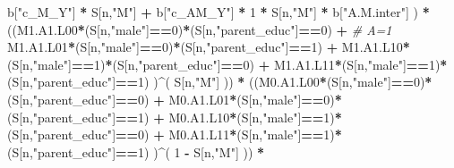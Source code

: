 \documentclass[
]{book}
\newenvironment{Shaded}{\begin{snugshade}}{\end{snugshade}}
\newcommand{\CommentTok}[1]{\textcolor[rgb]{0.56,0.35,0.01}{\textit{#1}}}
\newcommand{\DecValTok}[1]{\textcolor[rgb]{0.00,0.00,0.81}{#1}}
\newcommand{\NormalTok}[1]{#1}
\newcommand{\SpecialCharTok}[1]{\textcolor[rgb]{0.81,0.36,0.00}{\textbf{#1}}}
\newcommand{\StringTok}[1]{\textcolor[rgb]{0.31,0.60,0.02}{#1}}
\begin{document}
\begin{Shaded}
\begin{Highlighting}[]
\NormalTok{                             b[}\StringTok{"c\_M\_Y"}\NormalTok{] }\SpecialCharTok{*}\NormalTok{ S[n,}\StringTok{"M"}\NormalTok{] }\SpecialCharTok{+}
\NormalTok{                             b[}\StringTok{"c\_AM\_Y"}\NormalTok{] }\SpecialCharTok{*} \DecValTok{1} \SpecialCharTok{*}\NormalTok{ S[n,}\StringTok{"M"}\NormalTok{] }\SpecialCharTok{*}\NormalTok{ b[}\StringTok{"A.M.inter"}\NormalTok{] ) }\SpecialCharTok{*}
\NormalTok{      ((M1.A1.L00}\SpecialCharTok{*}\NormalTok{(S[n,}\StringTok{"male"}\NormalTok{]}\SpecialCharTok{==}\DecValTok{0}\NormalTok{)}\SpecialCharTok{*}\NormalTok{(S[n,}\StringTok{"parent\_educ"}\NormalTok{]}\SpecialCharTok{==}\DecValTok{0}\NormalTok{) }\SpecialCharTok{+}                    \CommentTok{\# A\textquotesingle{}=1}
\NormalTok{          M1.A1.L01}\SpecialCharTok{*}\NormalTok{(S[n,}\StringTok{"male"}\NormalTok{]}\SpecialCharTok{==}\DecValTok{0}\NormalTok{)}\SpecialCharTok{*}\NormalTok{(S[n,}\StringTok{"parent\_educ"}\NormalTok{]}\SpecialCharTok{==}\DecValTok{1}\NormalTok{) }\SpecialCharTok{+}
\NormalTok{          M1.A1.L10}\SpecialCharTok{*}\NormalTok{(S[n,}\StringTok{"male"}\NormalTok{]}\SpecialCharTok{==}\DecValTok{1}\NormalTok{)}\SpecialCharTok{*}\NormalTok{(S[n,}\StringTok{"parent\_educ"}\NormalTok{]}\SpecialCharTok{==}\DecValTok{0}\NormalTok{) }\SpecialCharTok{+} 
\NormalTok{          M1.A1.L11}\SpecialCharTok{*}\NormalTok{(S[n,}\StringTok{"male"}\NormalTok{]}\SpecialCharTok{==}\DecValTok{1}\NormalTok{)}\SpecialCharTok{*}\NormalTok{(S[n,}\StringTok{"parent\_educ"}\NormalTok{]}\SpecialCharTok{==}\DecValTok{1}\NormalTok{) )}\SpecialCharTok{\^{}}\NormalTok{( S[n,}\StringTok{"M"}\NormalTok{] )) }\SpecialCharTok{*}
\NormalTok{      ((M0.A1.L00}\SpecialCharTok{*}\NormalTok{(S[n,}\StringTok{"male"}\NormalTok{]}\SpecialCharTok{==}\DecValTok{0}\NormalTok{)}\SpecialCharTok{*}\NormalTok{(S[n,}\StringTok{"parent\_educ"}\NormalTok{]}\SpecialCharTok{==}\DecValTok{0}\NormalTok{) }\SpecialCharTok{+}                
\NormalTok{          M0.A1.L01}\SpecialCharTok{*}\NormalTok{(S[n,}\StringTok{"male"}\NormalTok{]}\SpecialCharTok{==}\DecValTok{0}\NormalTok{)}\SpecialCharTok{*}\NormalTok{(S[n,}\StringTok{"parent\_educ"}\NormalTok{]}\SpecialCharTok{==}\DecValTok{1}\NormalTok{) }\SpecialCharTok{+}
\NormalTok{          M0.A1.L10}\SpecialCharTok{*}\NormalTok{(S[n,}\StringTok{"male"}\NormalTok{]}\SpecialCharTok{==}\DecValTok{1}\NormalTok{)}\SpecialCharTok{*}\NormalTok{(S[n,}\StringTok{"parent\_educ"}\NormalTok{]}\SpecialCharTok{==}\DecValTok{0}\NormalTok{) }\SpecialCharTok{+} 
\NormalTok{          M0.A1.L11}\SpecialCharTok{*}\NormalTok{(S[n,}\StringTok{"male"}\NormalTok{]}\SpecialCharTok{==}\DecValTok{1}\NormalTok{)}\SpecialCharTok{*}\NormalTok{(S[n,}\StringTok{"parent\_educ"}\NormalTok{]}\SpecialCharTok{==}\DecValTok{1}\NormalTok{) )}\SpecialCharTok{\^{}}\NormalTok{( }\DecValTok{1} \SpecialCharTok{{-}}\NormalTok{ S[n,}\StringTok{"M"}\NormalTok{] )) }\SpecialCharTok{*}

\end{Highlighting}
\end{Shaded}
\end{document}
